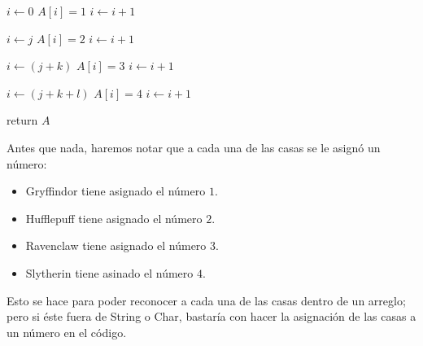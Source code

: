 \documentclass[letterpaper,11pt]{article}
\begin{document}
\begin{enumerate}
\begin{center}
\begin{minipage}[c]{0.81\textwidth}
\begin{algorithm}[H]
\begin{algorithmic}[1]
                \State $i \gets 0$
                    \State $A[i] = 1$
                    \State $i \gets i + 1$
                \EndWhile

                \State $i \gets j$
                    \State $A[i] = 2$
                    \State $i \gets i + 1$
                \EndWhile

                \State $i \gets (j + k)$
                    \State $A[i] = 3$
                    \State $i \gets i + 1$
                \EndWhile

                \State $i \gets (j + k + l)$
                 
                    \State $A[i] = 4$
                    \State $i \gets i + 1$
                \EndWhile

                \State return $A$
            \end{algorithmic} 
        \end{algorithm}
        \end{minipage}
    \end{center}

    Antes que nada, haremos notar que a cada una de las casas se le asignó un 
    número:
    \begin{itemize}
        \item Gryffindor tiene asignado el número $1$.
        \item Hufflepuff tiene asignado el número $2$.
        \item Ravenclaw tiene asignado el número $3$.
        \item Slytherin tiene asinado el número $4$.
    \end{itemize}

    Esto se hace para poder reconocer a cada una de las casas dentro de un 
    arreglo; pero si éste fuera de String o Char, bastaría con hacer la 
    asignación de las casas a un número en el código.


\end{enumerate}
\end{document}
